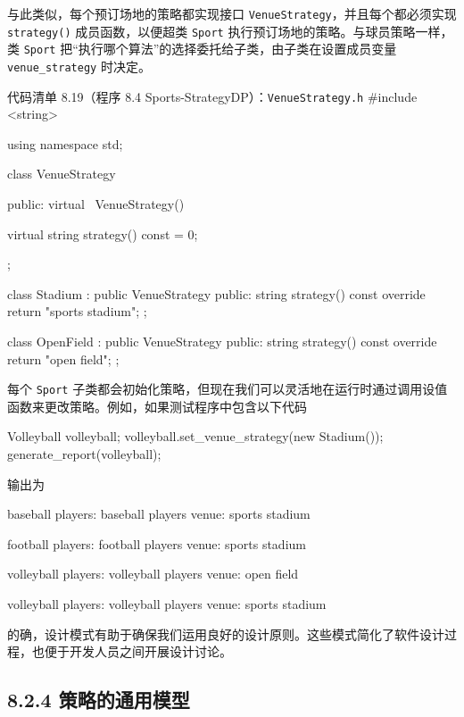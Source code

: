 与此类似，每个预订场地的策略都实现接口 \texttt{Venue\allowbreak{}Strategy}，并且每个都必须实现 \texttt{strategy(\allowbreak{})\allowbreak{}} 成员函数，以便超类 \texttt{Sport} 执行预订场地的策略。与球员策略一样，类 \texttt{Sport} 把“执行哪个算法”的选择委托给子类，由子类在设置成员变量 \texttt{venue\_\allowbreak{}strategy} 时决定。

\begin{codeboxt}{代码清单 8.19（程序 8.4 Sports-StrategyDP）：\texttt{Venue\allowbreak{}Strategy.\allowbreak{}h}}
#include <string>

using namespace std;

class VenueStrategy
{
public:
    virtual ~VenueStrategy() {}

    virtual string strategy() const = 0;
};

class Stadium : public VenueStrategy
{
public:
    string strategy() const override
    {
        return "sports stadium";
    }
};

class OpenField : public VenueStrategy
{
public:
    string strategy() const override
    {
        return "open field";
    }
};
\end{codeboxt}

每个 \texttt{Sport} 子类都会初始化策略，但现在我们可以灵活地在运行时通过调用设值函数来更改策略。例如，如果测试程序中包含以下代码

\begin{codebox}
    Volleyball volleyball;
    volleyball.set_venue_strategy(new Stadium());
    generate_report(volleyball);
\end{codebox}

输出为

\begin{codebox}
baseball
  players: baseball players
    venue: sports stadium

football
  players: football players
    venue: sports stadium

volleyball
  players: volleyball players
    venue: open field

volleyball
  players: volleyball players
    venue: sports stadium
\end{codebox}


的确，设计模式有助于确保我们运用良好的设计原则。这些模式简化了软件设计过程，也便于开发人员之间开展设计讨论。

\subsection{8.2.4 策略的通用模型}

